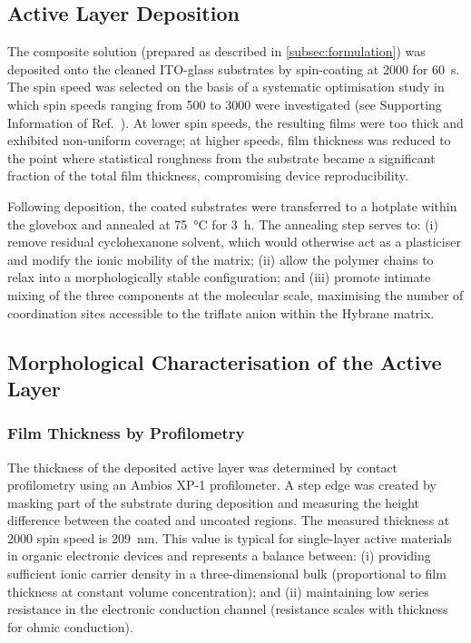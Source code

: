 \documentclass[12pt, a4paper, twoside]{report}
\begin{document}
\subsection{Active Layer Deposition}\label{subsec:spincoat}

The composite solution (prepared as described in \cref{subsec:formulation}) was deposited onto the cleaned ITO-glass substrates by spin-coating at \SI{2000}{\rpm} for \SI{60}{\second}. The spin speed was selected on the basis of a systematic optimisation study in which spin speeds ranging from \SI{500}{\rpm} to \SI{3000}{\rpm} were investigated (see Supporting Information of Ref.~\cite{PradoSocorro2022}). At lower spin speeds, the resulting films were too thick and exhibited non-uniform coverage; at higher speeds, film thickness was reduced to the point where statistical roughness from the substrate became a significant fraction of the total film thickness, compromising device reproducibility.

Following deposition, the coated substrates were transferred to a hotplate within the glovebox and annealed at \SI{75}{\celsius} for \SI{3}{\hour}. The annealing step serves to: (i) remove residual cyclohexanone solvent, which would otherwise act as a plasticiser and modify the ionic mobility of the matrix; (ii) allow the polymer chains to relax into a morphologically stable configuration; and (iii) promote intimate mixing of the three components at the molecular scale, maximising the number of  coordination sites accessible to the triflate anion within the Hybrane matrix.

\subsection{Morphological Characterisation of the Active Layer}\label{subsec:morphology}

\subsubsection{Film Thickness by Profilometry}

The thickness of the deposited active layer was determined by contact profilometry using an Ambios XP-1 profilometer. A step edge was created by masking part of the substrate during deposition and measuring the height difference between the coated and uncoated regions. The measured thickness at \SI{2000}{\rpm} spin speed is \SI{209}{\nano\metre}. This value is typical for single-layer active materials in organic electronic devices and represents a balance between: (i) providing sufficient ionic carrier density in a three-dimensional bulk (proportional to film thickness at constant volume concentration); and (ii) maintaining low series resistance in the electronic conduction channel (resistance scales with thickness for ohmic conduction).
\end{document}

